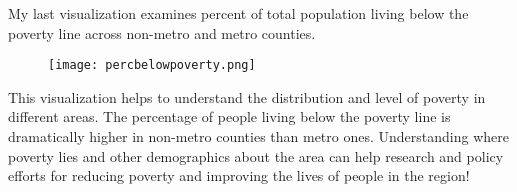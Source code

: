 \documentclass{homework}
\begin{document}
\newpage
\exercise
My last visualization examines percent of total population living below the poverty line across non-metro and metro counties.
\begin{figure}[h]
    \texttt{[image: percbelowpoverty.png]}
\end{figure}

This visualization helps to understand the distribution and level of poverty in different areas. The percentage of people living below the poverty line is dramatically higher in non-metro counties than metro ones. Understanding where poverty lies and other demographics about the area can help research and policy efforts for reducing poverty and improving the lives of people in the region!
\end{document}
